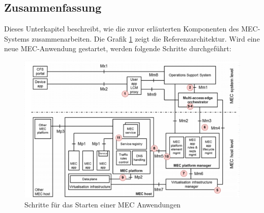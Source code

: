 \documentclass[runningheads]{llncs}
\numberwithin{figure}{section}
\begin{document}
\subsection{Zusammenfassung}
Dieses Unterkapitel beschreibt, wie die zuvor erläuterten Komponenten des MEC-Systems zusammenarbeiten. Die Grafik \ref{fig:ablaufmec} zeigt die 
Referenzarchitektur. Wird eine neue MEC-Anwendung gestartet, werden folgende Schritte durchgeführt:
\begin{figure}
  \includegraphics[width=\linewidth]{images/mec-referenzepoints.png}
  \caption{Schritte für das Starten einer MEC Anwendungen \cite{etsiMultiaccessEdgeComputinga}}
  \label{fig:ablaufmec}
\end{figure}
\end{document}

